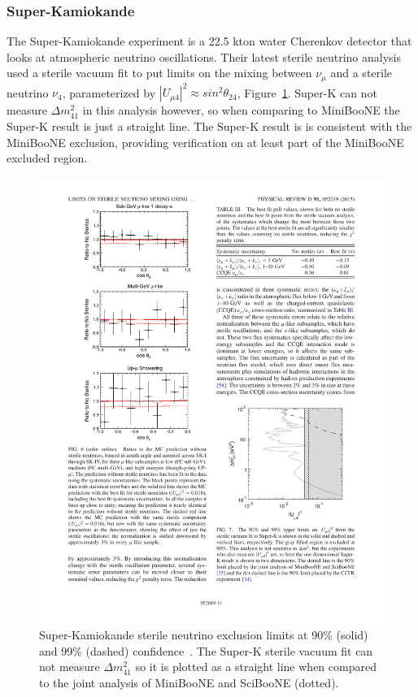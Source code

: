 \documentclass[aps,prd,twocolumn,nofootinbib]{revtex4-1}
\begin{document}
\subsubsection{Super-Kamiokande}
The Super-Kamiokande experiment is a 22.5 kton water Cherenkov detector that looks at atmospheric neutrino oscillations. Their latest sterile neutrino analysis~\cite{SuperK} used a sterile vacuum fit to put limits on the mixing between $\nu_{\mu}$ and a sterile neutrino $\nu_4$, parameterized by $\left|U_{\mu 4}\right|^2 \approx sin^2 \theta_{24}$, Figure~\ref{fig:SuperK}. Super-K can not measure $\Delta m^{2}_{41}$ in this analysis however, so when comparing to MiniBooNE the Super-K result is just a straight line. The Super-K result is is consistent with the MiniBooNE exclusion, providing verification on at least part of the MiniBooNE excluded region.

\begin{figure}[H]
 \centering
 \includegraphics[width=1\columnwidth]{../figures/sk1.pdf}
 \caption{Super-Kamiokande sterile neutrino exclusion limits at 90\% (solid) and 99\% (dashed) confidence~\cite{SuperK}. The Super-K sterile vacuum fit can not measure $\Delta m^{2}_{41}$ so it is plotted as a straight line when compared to the joint analysis of MiniBooNE and SciBooNE (dotted).}
 \label{fig:SuperK}
\end{figure}
\end{document}

